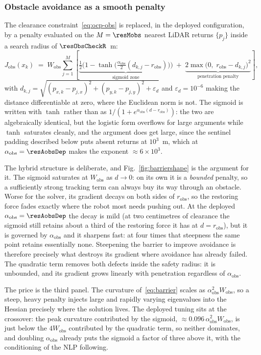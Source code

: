 \documentclass[11pt,a4paper]{article}
\newcommand{\Jobs}{J_{\mathrm{obs}}}
\newcommand{\Wobs}{W_{\mathrm{obs}}}
\newcommand{\aobs}{\alpha_{\mathrm{obs}}}
\newcommand{\robs}{r_{\mathrm{obs}}}
\begin{document}
\subsubsection{Obstacle avoidance as a smooth penalty}
\label{sec:barrier}

The clearance constraint~\eqref{eq:ocp-obs} is replaced, in the deployed configuration, by a penalty
evaluated on the $M=\resMobs$ nearest LiDAR returns $\{p_j\}$ inside a search radius of
$\resObsCheckR$~m:
\begin{equation}
  \Jobs(x_k) \;=\; \Wobs\sum_{j=1}^{M}
  \left[\underbrace{\tfrac12\Big(1-\tanh\big(\tfrac{\aobs}{2}(d_{k,j}-\robs)\big)\Big)}_{\text{sigmoid zone}}
  \;+\;\underbrace{2\max\!\big(0,\;\robs-d_{k,j}\big)^2}_{\text{penetration penalty}}\right],
  \label{eq:barrier}
\end{equation}
with $d_{k,j}=\sqrt{(p_{x,k}-p_{j,x})^2+(p_{y,k}-p_{j,y})^2+\varepsilon_d}$ and $\varepsilon_d=10^{-6}$ making
the distance differentiable at zero, where the Euclidean norm is not. The sigmoid is written with $\tanh$
rather than as $1/(1+e^{\aobs(d-\robs)})$: the two are algebraically identical, but the logistic form
overflows for large arguments while $\tanh$ saturates cleanly, and the argument does get large, since
the sentinel padding described below puts absent returns at $10^3$~m, which at $\aobs=\resAobsDep$ makes
the exponent $\approx6\times10^{3}$.

The hybrid structure is deliberate, and Fig.~\ref{fig:barriershape} is the argument for it. The sigmoid
saturates at $\Wobs$ as $d\to0$: on its own it is a \emph{bounded} penalty, so a sufficiently strong
tracking term can always buy its way through an obstacle. Worse for the solver, its gradient decays on both
sides of $\robs$, so the restoring force fades exactly where the robot most needs pushing out. At the
deployed $\aobs=\resAobsDep$ the decay is mild (at two centimetres of clearance the sigmoid still
retains about a third of the restoring force it has at $d=\robs$), but it is governed by $\aobs$ and it
sharpens fast: at four times that steepness the same point retains essentially none. Steepening the barrier
to improve avoidance is therefore precisely what destroys its gradient where avoidance has already failed.
The quadratic term removes both defects inside the safety radius: it is unbounded, and its gradient grows
linearly with penetration regardless of $\aobs$.

The price is the third panel. The curvature of~\eqref{eq:barrier} scales as $\aobs^2\Wobs$, so a steep,
heavy penalty injects large and rapidly varying eigenvalues into the Hessian precisely where the solution
lives. The deployed tuning sits at the crossover: the peak curvature contributed by the sigmoid,
$\approx0.096\,\aobs^2\Wobs$, is just below the $4\Wobs$ contributed by the quadratic term, so neither
dominates, and doubling $\aobs$ already puts the sigmoid a factor of three above it, with the
conditioning of the NLP following.
\end{document}

